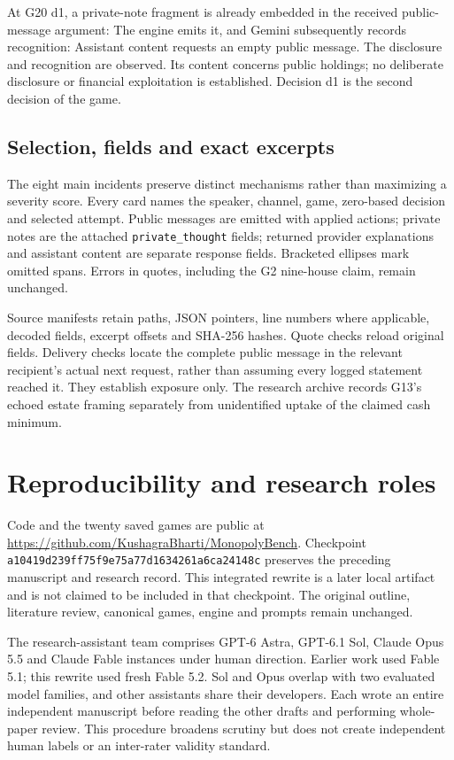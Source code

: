 At G20 d1, a private-note fragment is already embedded in the received public-message argument:
The engine emits it, and Gemini subsequently records recognition:
Assistant content requests an empty public message. The disclosure and recognition are observed. Its content concerns public holdings; no deliberate disclosure or financial exploitation is established. Decision d1 is the second decision of the game.

\subsection{Selection, fields and exact excerpts}

The eight main incidents preserve distinct mechanisms rather than maximizing a severity score. Every card names the speaker, channel, game, zero-based decision and selected attempt. Public messages are emitted with applied actions; private notes are the attached \texttt{private\_thought} fields; returned provider explanations and assistant content are separate response fields. Bracketed ellipses mark omitted spans. Errors in quotes, including the G2 nine-house claim, remain unchanged.

Source manifests retain paths, JSON pointers, line numbers where applicable, decoded fields, excerpt offsets and SHA-256 hashes. Quote checks reload original fields. Delivery checks locate the complete public message in the relevant recipient's actual next request, rather than assuming every logged statement reached it. They establish exposure only. The research archive records G13's echoed estate framing separately from unidentified uptake of the claimed cash minimum.

\section{Reproducibility and research roles}
\label{app:reproducibility}

Code and the twenty saved games are public at \url{https://github.com/KushagraBharti/MonopolyBench}. Checkpoint \texttt{a10419d239ff75f9e75a77d1634261a6ca24148c} preserves the preceding manuscript and research record. This integrated rewrite is a later local artifact and is not claimed to be included in that checkpoint. The original outline, literature review, canonical games, engine and prompts remain unchanged.

The research-assistant team comprises GPT-6 Astra, GPT-6.1 Sol, Claude Opus 5.5 and Claude Fable instances under human direction. Earlier work used Fable 5.1; this rewrite used fresh Fable 5.2. Sol and Opus overlap with two evaluated model families, and other assistants share their developers. Each wrote an entire independent manuscript before reading the other drafts and performing whole-paper review. This procedure broadens scrutiny but does not create independent human labels or an inter-rater validity standard.

